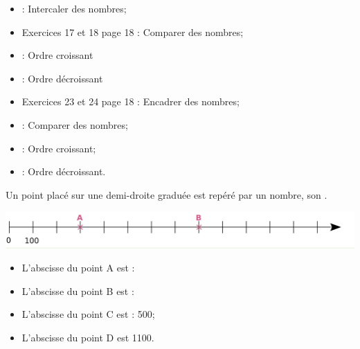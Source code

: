 \begin{myexos}
	\begin{itemize}
		\item {} : Intercaler des nombres;
		\item Exercices 17 et 18 page 18 : Comparer des nombres;
		\item {} : Ordre croissant
		\item {} : Ordre décroissant
		\item Exercices 23 et 24 page 18 : Encadrer des nombres;
		\item {} : Comparer des nombres;
		\item {} : Ordre croissant;
		\item {} : Ordre décroissant.
	\end{itemize}
\end{myexos}


\begin{myprop}
	Un point placé sur une demi-droite graduée est repéré par un nombre, son .
\end{myprop}

\begin{myex}
	\begin{center}
		\includegraphics[scale=0.5]{img/axe}
	\end{center}

	\begin{itemize}
		\item L'abscisse du point A est :
		\item L'abscisse du point B est :
		\item L'abscisse du point C est : 500;
		\item L'abscisse du point D est \num{1100}.
	\end{itemize}
\end{myex}